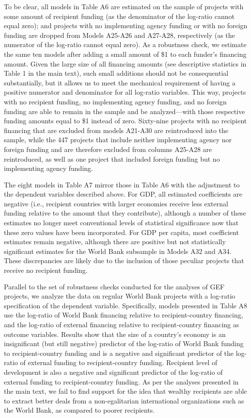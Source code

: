 \documentclass{article}
\begin{document}
To be clear, all models in Table A6 are estimated on the sample of projects with some amount of recipient funding (as the denominator of the log-ratio cannot equal zero); and projects with no implementing agency funding or with no foreign funding are dropped from Models A25-A26 and A27-A28, respectively (as the numerator of the log-ratio cannot equal zero).  As a robustness check, we estimate the same ten models after adding a small amount of \$1 to each funder’s financing amount.  Given the large size of all financing amounts (see descriptive statistics in Table 1 in the main text), such small additions should not be consequential substantially, but it allows us to meet the mechanical requirement of having a positive numerator and denominator for all log-ratio variables.  This way, projects with no recipient funding, no implementing agency funding, and no foreign funding are able to remain in the sample and be analyzed---with those respective funding amounts equal to \$1 instead of zero. Sixty-nine projects with no recipient financing that are excluded from models A21-A30 are reintroduced into the sample, while the 447 projects that include neither implementing agency nor foreign funding and are therefore excluded from columns A25-A28 are reintroduced, as well as one project that included foreign funding but no implementing agency funding.

The eight models in Table A7 mirror those in Table A6 with the adjustment to the dependent variables described above.  For GDP, all estimated coefficients are negative (i.e., recipient countries with larger economies receive less external funding relative to the amount that they contribute), although a number of these estimates no longer meet conventional levels of statistical significance now that these zero values have been incorporated.  For GDP per capita, most coefficient estimates remain negative, although there are positive but not statistically significant estimates for the World Bank subsample in Models A32 and A34.  These discrepancies are likely due to the inclusion of those peculiar projects that receive no recipient funding. 

Parallel to the set of robustness checks conducted for the analyses of GEF projects, we analyze the data on regular World Bank projects with a log-ratio specification of the dependent variable. Specifically, models presented in Table A8 use the log-ratio of World Bank financing relative to recipient-country financing, and the log-ratio of external financing relative to recipient-country financing as outcome variables. Results show that the size of a country’s economy is an insignificant (but still negative) predictor of the log-ratio of World Bank funding to recipient-country funding and is a negative and significant predictor of the log-ratio of external funding to recipient-country funding. Recipient level of development is also a negative and significant predictor of the log-ratio of external funding to recipient-country funding. As per the analyses presented in the main text, we fail to find support for the idea that wealthy recipients are able to extract better deals from a non-egalitarian international organizations such as the World Bank, as compared to poorer recipients. 
\end{document}
